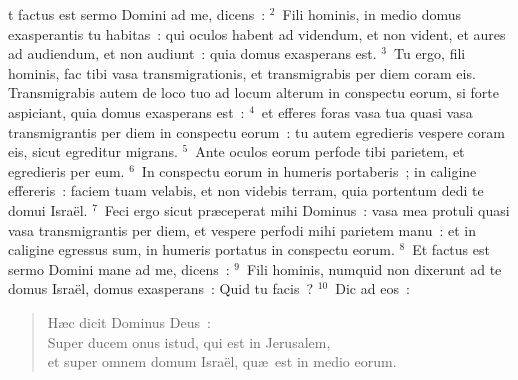 \bchapter
{}t factus est sermo Domini ad me, dicens~:
${}^{2}$~Fili hominis, in medio domus exasperantis tu habitas~: qui oculos habent ad videndum, et non vident, et aures ad audiendum, et non audiunt~: quia domus exasperans est.
${}^{3}$~Tu ergo, fili hominis, fac tibi vasa transmigrationis, et transmigrabis per diem coram eis. Transmigrabis autem de loco tuo ad locum alterum in conspectu eorum, si forte aspiciant, quia domus exasperans est~:
${}^{4}$~et efferes foras vasa tua quasi vasa transmigrantis per diem in conspectu eorum~: tu autem egredieris vespere coram eis, sicut egreditur migrans.
${}^{5}$~Ante oculos eorum perfode tibi parietem, et egredieris per eum.
${}^{6}$~In conspectu eorum in humeris portaberis~; in caligine effereris~: faciem tuam velabis, et non videbis terram, quia portentum dedi te domui Isra\"el.
${}^{7}$~Feci ergo sicut pr\ae ceperat mihi Dominus~: vasa mea protuli quasi vasa transmigrantis per diem, et vespere perfodi mihi parietem manu~: et in caligine egressus sum, in humeris portatus in conspectu eorum.
${}^{8}$~Et factus est sermo Domini mane ad me, dicens~:
${}^{9}$~Fili hominis, numquid non dixerunt ad te domus Isra\"el, domus exasperans~: Quid tu facis~?
${}^{10}$~Dic ad eos~: \begin{verse}H\ae c dicit Dominus Deus~:\\ Super ducem onus istud, qui est in Jerusalem,\\ et super omnem domum Isra\"el, qu\ae\ est in medio eorum.\end{verse}


